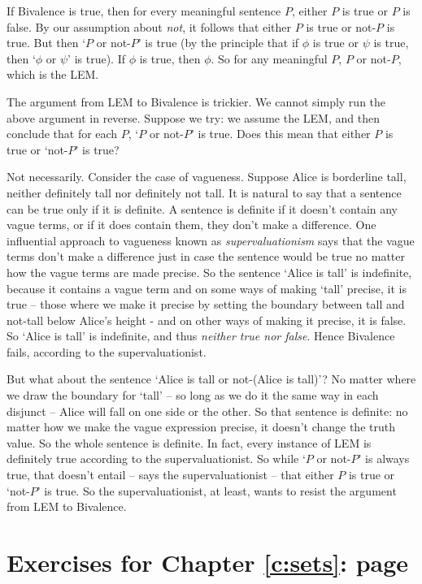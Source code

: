 {\begin{enumerate}
If Bivalence is true, then for every meaningful sentence $P$, either $P$ is true or $P$ is false. By our assumption about \emph{not}, it follows that either $P$ is true or not-$P$ is true. But then `$P$ or not-$P$' is true (by the principle that if $\phi$ is true or $\psi$ is true, then `$\phi$ or $\psi$' is true). If $\phi$ is true, then $\phi$. So for any meaningful $P$, $P$ or not-$P$, which is the LEM.

The argument from LEM to Bivalence is trickier. We cannot simply run the above argument in reverse. Suppose we try: we assume the LEM, and then conclude that for each $P$, `$P$ or not-$P$' is true. Does this mean that either $P$ is true or `not-$P$' is true? 

Not necessarily. Consider the case of vagueness. Suppose Alice is borderline tall, neither definitely tall nor definitely not tall. It is natural to say that a sentence can be true only if it is definite. A sentence is definite if it doesn't contain any vague terms, or if it does contain them, they don't make a difference. One influential approach to vagueness known as \emph{supervaluationism} \citep{fine} says that the vague terms don't make a difference just in case the sentence would be true no matter how the vague terms are made precise. So the sentence `Alice is tall' is indefinite, because it contains a vague term and on some ways of making `tall' precise, it is true – those where we make it precise by setting the boundary between tall and not-tall below Alice's height - and on other ways of making it precise, it is false. So `Alice is tall' is indefinite, and thus \emph{neither true nor false}. Hence Bivalence fails, according to the supervaluationist.

But what about the sentence `Alice is tall or not-(Alice is tall)'? No matter where we draw the boundary for `tall' – so long as we do it the same way in each disjunct – Alice will fall on one side or the other. So that sentence is definite: no matter how we make the vague expression precise, it doesn't change the truth value. So the whole sentence is definite. In fact, every instance of LEM is definitely true according to the supervaluationist. So while `$P$ or not-$P$' is always true, that doesn't entail – says the supervaluationist – that either $P$ is true or `not-$P$' is true. So the supervaluationist, at least, wants to resist the argument from LEM to Bivalence.
\end{enumerate}

\section*{Exercises for Chapter \ref{c:sets}: page \pageref{ex:sets}} \label{ans:sets}

}
